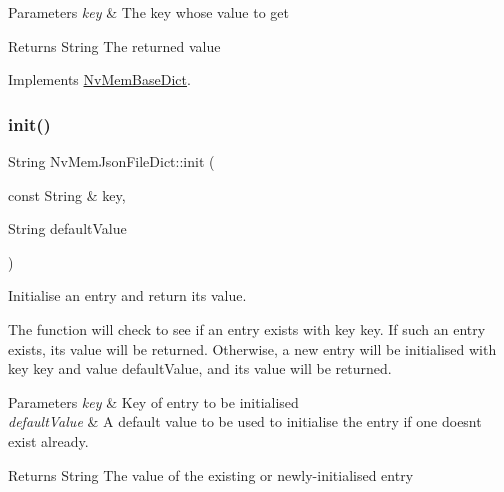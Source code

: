\begin{DoxyParams}{Parameters}
{\em key} & The key whose value to get \\
\hline
\end{DoxyParams}
\begin{DoxyReturn}{Returns}
String The returned value 
\end{DoxyReturn}


Implements \mbox{\hyperlink{class_nv_mem_base_dict_a876f70d76462b15bfc23cab438077d17}{Nv\+Mem\+Base\+Dict}}.

\mbox{\label{class_nv_mem_json_file_dict_ad3e3c8f549a873f194a0d5ff60063f39}} 
\subsubsection{\texorpdfstring{init()}{init()}}
{\footnotesize\ttfamily String Nv\+Mem\+Json\+File\+Dict\+::init (\begin{DoxyParamCaption}\item[{const String \&}]{key,  }\item[{String}]{default\+Value }\end{DoxyParamCaption})}



Initialise an entry and return its value. 

The function will check to see if an entry exists with key {\ttfamily key}. If such an entry exists, its value will be returned. Otherwise, a new entry will be initialised with key {\ttfamily key} and value {\ttfamily default\+Value}, and its value will be returned.


\begin{DoxyParams}{Parameters}
{\em key} & Key of entry to be initialised \\
\hline
{\em default\+Value} & A default value to be used to initialise the entry if one doesn\textquotesingle{}t exist already. \\
\hline
\end{DoxyParams}
\begin{DoxyReturn}{Returns}
String The value of the existing or newly-\/initialised entry 
\end{DoxyReturn}
\mbox{\label{class_nv_mem_json_file_dict_a251c5ae54e2b2f0482e2cfc9baf8854b}} 
